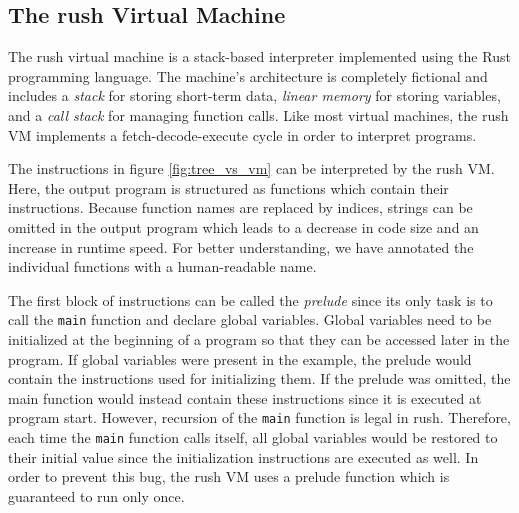 \subsection{The rush Virtual Machine}

The rush virtual machine is a stack-based interpreter implemented using the Rust programming language.
The machine's architecture is completely fictional and includes a \emph{stack} for storing short-term data, \emph{linear memory} for storing variables, and a \emph{call stack} for managing function calls.
Like most virtual machines, the rush VM implements a fetch-decode-execute cycle in order to interpret programs.


The instructions in figure \ref{fig:tree_vs_vm} can be interpreted by the rush VM.
Here, the output program is structured as functions which contain their instructions.
Because function names are replaced by indices, strings can be omitted in the output program which leads to a decrease in code size and an increase in runtime speed.
For better understanding, we have annotated the individual functions with a human-readable name.

The first block of instructions can be called the \emph{prelude} since its only task is to call the \texttt{main} function and declare global variables.
Global variables need to be initialized at the beginning of a program so that they can be accessed later in the program.
If global variables were present in the example, the prelude would contain the instructions used for initializing them.
If the prelude was omitted, the main function would instead contain these instructions since it is executed at program start.
However, recursion of the \texttt{main} function is legal in rush.
Therefore, each time the \texttt{main} function calls itself,
all global variables would be restored to their initial value since the initialization instructions are executed as well.
In order to prevent this bug, the rush VM uses a prelude function which is guaranteed to run only once.

